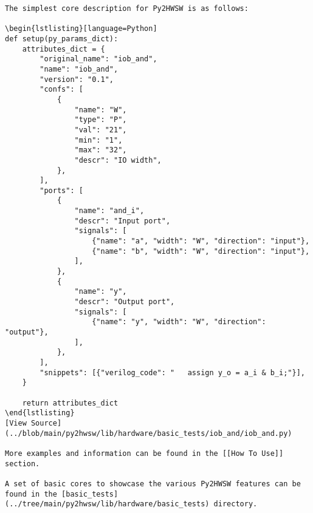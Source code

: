 \begin{verbatim}
The simplest core description for Py2HWSW is as follows:

\begin{lstlisting}[language=Python]
def setup(py_params_dict):
    attributes_dict = {
        "original_name": "iob_and",
        "name": "iob_and",
        "version": "0.1",
        "confs": [
            {
                "name": "W",
                "type": "P",
                "val": "21",
                "min": "1",
                "max": "32",
                "descr": "IO width",
            },
        ],
        "ports": [
            {
                "name": "and_i",
                "descr": "Input port",
                "signals": [
                    {"name": "a", "width": "W", "direction": "input"},
                    {"name": "b", "width": "W", "direction": "input"},
                ],
            },
            {
                "name": "y",
                "descr": "Output port",
                "signals": [
                    {"name": "y", "width": "W", "direction": "output"},
                ],
            },
        ],
        "snippets": [{"verilog_code": "   assign y_o = a_i & b_i;"}],
    }

    return attributes_dict
\end{lstlisting}
[View Source](../blob/main/py2hwsw/lib/hardware/basic_tests/iob_and/iob_and.py)

More examples and information can be found in the [[How To Use]] section.

A set of basic cores to showcase the various Py2HWSW features can be found in the [basic_tests](../tree/main/py2hwsw/lib/hardware/basic_tests) directory.
\end{verbatim}
